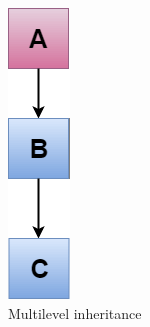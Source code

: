 \documentclass{book}
\begin{document}
\begin{figure}[h]
\includegraphics[width=\columnwidth]{multi-level-inheritance}%
\caption{Multilevel inheritance}%
\label{}%
\end{figure}
\end{document}
